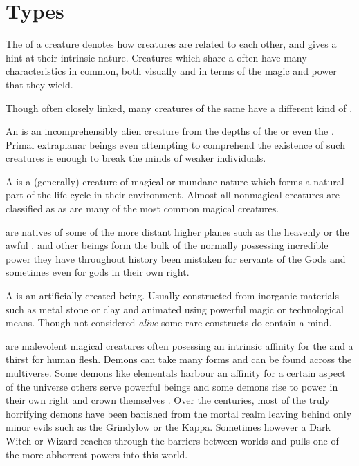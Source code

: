 \section{Types}

The  of a creature denotes how creatures are related to each other, and gives a hint at their intrinsic nature. Creatures which share a  often have many characteristics in common, both visually and in terms of the magic and power that they wield.

Though often closely linked, many creatures of the same  have a different kind of . 


{	
	An  is an incomprehensibly alien creature from the depths of the \comma{} or even the . Primal\comma{} extraplanar beings\comma{} even attempting to comprehend the existence of such creatures is enough to break the minds of weaker individuals.
}

{
	A  is a (generally)  creature of magical or mundane nature\comma{} which forms a natural part of the life cycle in their environment. Almost all non\minus{}magical creatures are classified as \comma{} as are many of the most common magical creatures.
}

{
	 are natives of some of the more distant higher planes\comma{} such as the heavenly \comma{} or the awful . \comma{}  and other beings form the bulk of the \comma{} normally possessing incredible power they have\comma{} throughout history\comma{} been mistaken for servants of the Gods and sometimes even for gods in their own right.
}

{
	A  is an artificially created being. Usually constructed from inorganic materials such as metal\comma{} stone or clay and animated using powerful magic or technological means. Though not considered {\it alive}\comma{} some rare constructs do contain a  mind.
}

{
	 are malevolent magical creatures\comma{} often posessing an intrinsic affinity for the \comma{} and a thirst for human flesh. Demons can take many forms\comma{} and can be found across the multiverse. Some demons\comma{} like elementals\comma{} harbour an affinity for a certain aspect of the universe\comma{} others serve powerful beings\comma{} and some demons rise to power in their own right and crown themselves . Over the centuries, most of the truly horrifying demons have been banished from the mortal realm\comma{} leaving behind only minor evils such as the Grindylow or the Kappa. Sometimes\comma{} however\comma{} a Dark Witch or Wizard reaches through the barriers between worlds and pulls one of the more abhorrent powers into this world.
}

